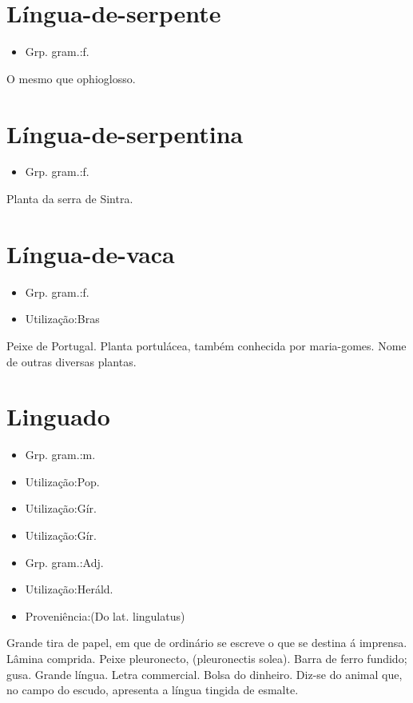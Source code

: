\section{Língua-de-serpente}
\begin{itemize}
\item {Grp. gram.:f.}
\end{itemize}
O mesmo que \textunderscore ophioglosso\textunderscore .
\section{Língua-de-serpentina}
\begin{itemize}
\item {Grp. gram.:f.}
\end{itemize}
Planta da serra de Sintra.
\section{Língua-de-vaca}
\begin{itemize}
\item {Grp. gram.:f.}
\end{itemize}
\begin{itemize}
\item {Utilização:Bras}
\end{itemize}
Peixe de Portugal.
Planta portulácea, também conhecida por \textunderscore maria-gomes\textunderscore .
Nome de outras diversas plantas.
\section{Linguado}
\begin{itemize}
\item {Grp. gram.:m.}
\end{itemize}
\begin{itemize}
\item {Utilização:Pop.}
\end{itemize}
\begin{itemize}
\item {Utilização:Gír.}
\end{itemize}
\begin{itemize}
\item {Utilização:Gír.}
\end{itemize}
\begin{itemize}
\item {Grp. gram.:Adj.}
\end{itemize}
\begin{itemize}
\item {Utilização:Heráld.}
\end{itemize}
\begin{itemize}
\item {Proveniência:(Do lat. \textunderscore lingulatus\textunderscore )}
\end{itemize}
Grande tira de papel, em que de ordinário se escreve o que se destina á imprensa.
Lâmina comprida.
Peixe pleuronecto, (\textunderscore pleuronectis solea\textunderscore ).
Barra de ferro fundido; gusa.
Grande língua.
Letra commercial.
Bolsa do dinheiro.
Diz-se do animal que, no campo do escudo, apresenta a língua tingida de esmalte.
